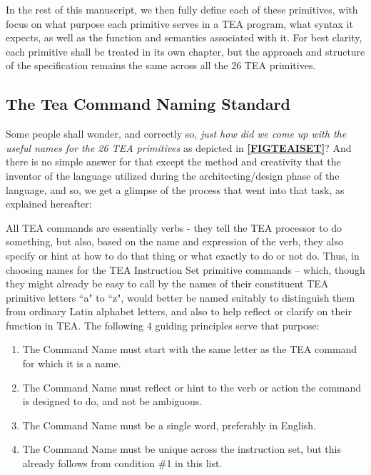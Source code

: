\documentclass[a4paper, 18pt]{book} %
\begin{document}
In the rest of this manuscript, we then fully define each of these primitives, with focus on what purpose each primitive serves in a TEA program, what syntax it expects, as well as the function and semantics associated with it. For best clarity, each primitive shall be treated in its own chapter, but the approach and structure of the specification remains the same across all the 26 TEA primitives.


\subsection{The Tea Command Naming Standard}

Some people shall wonder, and correctly so, \textit{just how did we come up with the useful names for the 26 TEA primitives} as depicted in \textbf{\autoref{FIGTEAISET}}? And there is no simple answer for that except the method and creativity that the inventor of the language utilized during the architecting/design phase of the language, and so, we get a glimpse of the process that went into that task, as explained hereafter:

All TEA commands are essentially verbs - they tell the TEA processor to do something, but also, based on the name and expression of the verb, they also specify or hint at how to do that thing or what exactly to do or not do. Thus, in choosing names for the TEA Instruction Set primitive commands – which, though they might already be easy to call by the names of their constituent TEA primitive letters ``a" to ``z", would better be named suitably to distinguish them from ordinary Latin alphabet letters, and also to help reflect or clarify on their function in TEA. The following 4 guiding principles serve that purpose:


\begin{enumerate}
\item The Command Name must start with the same letter as the TEA command for which it is a name.
\item The Command Name must reflect or hint to the verb or action the command is designed to do, and not be ambiguous.
\item The Command Name must be a single word, preferably in English.
\item The Command Name must be unique across the instruction set, but this already follows from condition \#1 in this list.
\end{enumerate}
\end{document}
